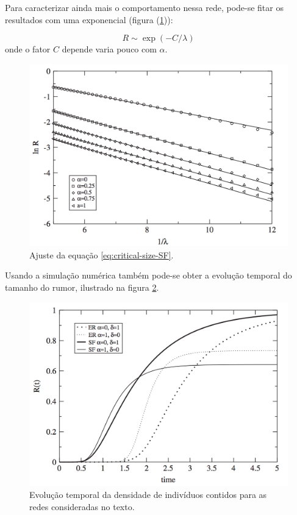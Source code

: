 \documentclass[a4paper,11pt]{report}
\begin{document}
Para caracterizar ainda mais o comportamento nessa rede, pode-se fitar os resultados com uma exponencial (figura (\ref{fig:critical-SF})):

\begin{equation}
R\sim \exp(-C/\lambda)
\label{eq:critical-size-SF}
\end{equation}
onde o fator $C$ depende varia pouco com $\alpha$. 


\begin{figure}[ht!]
\begin{center}
\includegraphics[scale=0.3]{./images/critical-SF}
\end{center}
\caption{Ajuste da equa\c{c}\~ao \ref{eq:critical-size-SF}.}
\label{fig:critical-SF}
\end{figure}

Usando a simula\c{c}\~ao num\'erica tamb\'em pode-se obter a evolu\c{c}\~ao temporal do tamanho do rumor, ilustrado na figura \ref{fig:evol-size-rumor}.


\begin{figure}[ht!]
\begin{center}
\includegraphics[scale=0.3]{./images/evol-size-rumor}
\end{center}
\caption{Evolu\c{c}\~ao temporal da densidade de indiv\'iduos contidos para as redes consideradas no texto.}
\label{fig:evol-size-rumor}
\end{figure}
\end{document}
